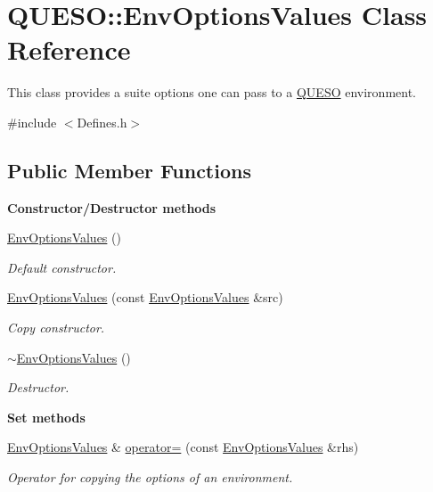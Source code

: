 \hypertarget{class_q_u_e_s_o_1_1_env_options_values}{\section{Q\-U\-E\-S\-O\-:\-:Env\-Options\-Values Class Reference}
\label{class_q_u_e_s_o_1_1_env_options_values}
}


This class provides a suite options one can pass to a \hyperlink{namespace_q_u_e_s_o}{Q\-U\-E\-S\-O} environment.  




{\ttfamily \#include $<$Defines.\-h$>$}

\subsection*{Public Member Functions}
\begin{Indent}{\bf Constructor/\-Destructor methods}\par
\begin{DoxyCompactItemize}
\item 
\hyperlink{class_q_u_e_s_o_1_1_env_options_values_a8abe66cfbf369f75ae702e3e12bd55e2}{Env\-Options\-Values} ()
\begin{DoxyCompactList}\small\item\em Default constructor. \end{DoxyCompactList}\item 
\hyperlink{class_q_u_e_s_o_1_1_env_options_values_a1b3fefd17eeb624dd8ffab50e3d7852e}{Env\-Options\-Values} (const \hyperlink{class_q_u_e_s_o_1_1_env_options_values}{Env\-Options\-Values} \&src)
\begin{DoxyCompactList}\small\item\em Copy constructor. \end{DoxyCompactList}\item 
\hyperlink{class_q_u_e_s_o_1_1_env_options_values_a0cbafe6611bafbaf169772088f8652c3}{$\sim$\-Env\-Options\-Values} ()
\begin{DoxyCompactList}\small\item\em Destructor. \end{DoxyCompactList}\end{DoxyCompactItemize}
\end{Indent}
\begin{Indent}{\bf Set methods}\par
\begin{DoxyCompactItemize}
\item 
\hyperlink{class_q_u_e_s_o_1_1_env_options_values}{Env\-Options\-Values} \& \hyperlink{class_q_u_e_s_o_1_1_env_options_values_a46925c34598844234c1a59f15165b141}{operator=} (const \hyperlink{class_q_u_e_s_o_1_1_env_options_values}{Env\-Options\-Values} \&rhs)
\begin{DoxyCompactList}\small\item\em Operator for copying the options of an environment. \end{DoxyCompactList}\end{DoxyCompactItemize}
\end{Indent}
